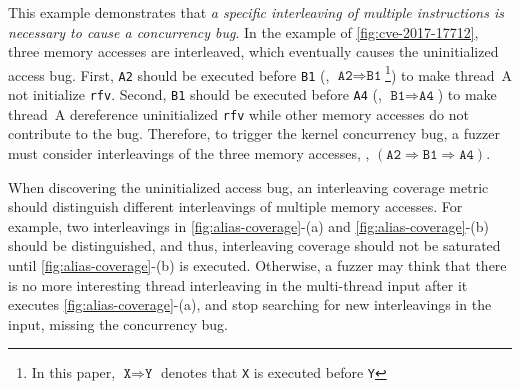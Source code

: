 %
This example demonstrates that \textit{a specific interleaving of
  multiple instructions is necessary to cause a concurrency bug}.
%
In the example of \autoref{fig:cve-2017-17712}, three memory accesses
are interleaved, which eventually causes the uninitialized access bug.
%
First, \texttt{A2} should be executed before \texttt{B1} (\ie,
$\texttt{A2} \Rightarrow \texttt{B1}$\footnote{In this paper,
  $\texttt{X} \Rightarrow \texttt{Y}$ denotes that \texttt{X} is
  executed before \texttt{Y}}) to make thread~A not initialize
\texttt{rfv}.
%
Second, \texttt{B1} should be executed before \texttt{A4} (\ie,
$\texttt{B1} \Rightarrow \texttt{A4}$) to make thread~A dereference
uninitialized \texttt{rfv} while other memory accesses do not
contribute to the bug.
%
Therefore, to trigger the kernel concurrency bug, a fuzzer must
consider interleavings of the three memory accesses, \eg,
$(\texttt{A2} \Rightarrow \texttt{B1} \Rightarrow \texttt{A4})$.


%
%
When discovering the uninitialized access bug, an interleaving
coverage metric should distinguish different interleavings of multiple
memory accesses.
%
For example, two interleavings in \autoref{fig:alias-coverage}-(a) and
\autoref{fig:alias-coverage}-(b) should be distinguished, and thus,
interleaving coverage should not be saturated until
\autoref{fig:alias-coverage}-(b) is executed.
%
Otherwise, a fuzzer may think that there is no more interesting thread
interleaving in the multi-thread input after it executes
\autoref{fig:alias-coverage}-(a), and stop searching for new
interleavings in the input, missing the concurrency bug.
%

